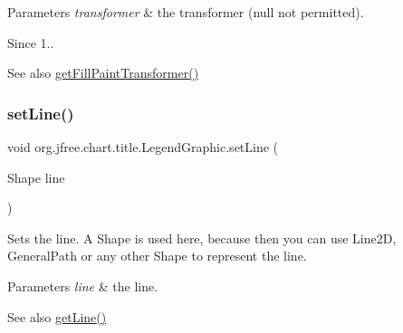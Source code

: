 \begin{DoxyParams}{Parameters}
{\em transformer} & the transformer ({\ttfamily null} not permitted).\\
\hline
\end{DoxyParams}
\begin{DoxySince}{Since}
1..
\end{DoxySince}
\begin{DoxySeeAlso}{See also}
\mbox{\hyperlink{classorg_1_1jfree_1_1chart_1_1title_1_1_legend_graphic_ae51819918572b58034792a02bc865bd3}{get\+Fill\+Paint\+Transformer()}} 
\end{DoxySeeAlso}
\mbox{\label{classorg_1_1jfree_1_1chart_1_1title_1_1_legend_graphic_a9b43b803b92c87a92717ce4fd1c6c484}} 
\subsubsection{\texorpdfstring{set\+Line()}{setLine()}}
{\footnotesize\ttfamily void org.\+jfree.\+chart.\+title.\+Legend\+Graphic.\+set\+Line (\begin{DoxyParamCaption}\item[{Shape}]{line }\end{DoxyParamCaption})}

Sets the line. A Shape is used here, because then you can use Line2D, General\+Path or any other Shape to represent the line.


\begin{DoxyParams}{Parameters}
{\em line} & the line.\\
\hline
\end{DoxyParams}
\begin{DoxySeeAlso}{See also}
\mbox{\hyperlink{classorg_1_1jfree_1_1chart_1_1title_1_1_legend_graphic_a29368c04acca49c9e247a41359583b16}{get\+Line()}} 
\end{DoxySeeAlso}
\mbox{\label{classorg_1_1jfree_1_1chart_1_1title_1_1_legend_graphic_ad8e6eae25621cbe61af6b006943d6d52}} 
